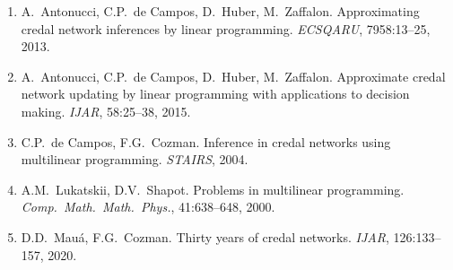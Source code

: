 \documentclass[11pt]{article}
\begin{document}
\begin{enumerate}
\item A.\ Antonucci, C.P.\ de Campos, D.\ Huber, M.\ Zaffalon. Approximating credal
      network inferences by linear programming. \emph{ECSQARU}, 7958:13--25, 2013.
\item A.\ Antonucci, C.P.\ de Campos, D.\ Huber, M.\ Zaffalon. Approximate credal
      network updating by linear programming with applications to decision making.
      \emph{IJAR}, 58:25--38, 2015.
\item C.P.\ de Campos, F.G.\ Cozman. Inference in credal networks using multilinear
      programming. \emph{STAIRS}, 2004.
\item A.M.\ Lukatskii, D.V.\ Shapot. Problems in multilinear programming.
      \emph{Comp.\ Math.\ Math.\ Phys.}, 41:638--648, 2000.
\item D.D.\ Mau\'a, F.G.\ Cozman. Thirty years of credal networks. \emph{IJAR},
      126:133--157, 2020.
\end{enumerate}
\end{document}
